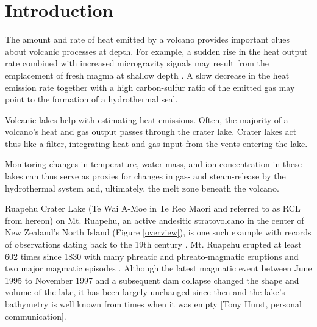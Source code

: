 \documentclass{bmcart}
\begin{document}


\section{Introduction}

The amount and rate of heat emitted by a volcano provides important clues about
volcanic processes at depth. For example, a sudden rise in the heat output rate
combined with increased microgravity signals may result from the emplacement of
fresh magma at shallow depth \cite{Brown1991}. A slow decrease in the heat
emission rate together with a high carbon-sulfur ratio of the emitted gas may
point to the formation of a hydrothermal seal.

Volcanic lakes help with estimating heat emissions. Often, the majority of a
volcano's heat and gas output passes through the crater lake. Crater lakes act thus
like a filter, integrating heat and gas input from the vents entering the lake.

Monitoring changes in temperature, water mass, and ion concentration in these
lakes can thus serve as proxies for changes in gas- and steam-release by the
hydrothermal system and, ultimately, the melt zone beneath the volcano. 

Ruapehu Crater Lake (Te Wai A-Moe in Te Reo Maori and referred to as RCL from
hereon) on Mt. Ruapehu, an active andesitic stratovolcano in the center of New
Zealand's North Island (Figure \ref{overview}), is one such example with records
of observations dating back to the 19th century \cite{Friedlander1898}. Mt.
Ruapehu erupted at least 602 times since 1830 with many phreatic and
phreato-magmatic eruptions and two major magmatic episodes \citep{Scott2013}.
Although the latest magmatic event between June 1995 to November 1997 and a
subsequent dam collapse changed the shape and volume of the lake, it has been
largely unchanged since then and the lake's bathymetry is well known from times
when it was empty [Tony Hurst, personal communication].
\end{document}
